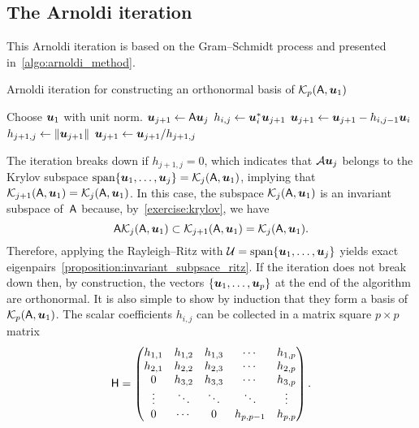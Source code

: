 \subsection{The Arnoldi iteration}
This Arnoldi iteration is based on the Gram--Schmidt process and presented in~\cref{algo:arnoldi_method}.
\begin{algorithm}
\caption{Arnoldi iteration for constructing an orthonormal basis of $\mathcal K_p(\mathsf A, \mathbf{\boldsymbol{u}}_1)$}%
\label{algo:arnoldi_method}%
\begin{algorithmic}
\State Choose $\mathbf{\boldsymbol{u}}_1$ with unit norm.
    \State $\mathbf{\boldsymbol{u}}_{j+1} \gets \mathsf A \mathbf{\boldsymbol{u}}_{j}$
        \State $h_{i,j} \gets \mathbf{\boldsymbol{u}}_{i}^* \mathbf{\boldsymbol{u}}_{j+1}$
        \State $\mathbf{\boldsymbol{u}}_{j+1} \gets \mathbf{\boldsymbol{u}}_{j+1} - h_{i,j-1} \mathbf{\boldsymbol{u}}_{i}$
    \EndFor
    \State $h_{j+1,j} \gets \lVert\mathbf{\boldsymbol{u}}_{j+1}\rVert$
    \State $\mathbf{\boldsymbol{u}}_{j+1} \gets \mathbf{\boldsymbol{u}}_{j+1} / h_{j+1,j}$
\EndFor
\end{algorithmic}
\end{algorithm}
The iteration breaks down if $h_{j+1,j} = 0$,
which indicates that $\mathcal A \mathbf{\boldsymbol{u}}_j$ belongs to the Krylov subspace $\operatorname{span} \{ \mathbf{\boldsymbol{u}}_1, \dotsc, \mathbf{\boldsymbol{u}}_j \} = \mathcal K_j(\mathsf A, \mathbf{\boldsymbol{u}}_1)$,
implying that $\mathcal K_{j+1}(\mathsf A, \mathbf{\boldsymbol{u}}_1) = \mathcal K_j(\mathsf A, \mathbf{\boldsymbol{u}}_1)$.
In this case, the subspace $\mathcal K_j(\mathsf A, \mathbf{\boldsymbol{u}}_1)$ is an invariant subspace of~$\mathsf A$ because, by~\cref{exercise:krylov},
we have
\[
    \mathsf A \mathcal K_j(\mathsf A, \mathbf{\boldsymbol{u}}_1)
    \subset \mathcal K_{j+1}(\mathsf A, \mathbf{\boldsymbol{u}}_1)
    = \mathcal K_j(\mathsf A, \mathbf{\boldsymbol{u}}_1).
\]
Therefore, applying the Rayleigh--Ritz with $\mathcal U = \operatorname{span} \{ \mathbf{\boldsymbol{u}}_1, \dotsc, \mathbf{\boldsymbol{u}}_j \}$ yields exact eigenpairs~\cref{proposition:invariant_subpsace_ritz}.
If the iteration does not break down then,
by construction,
the vectors $\{\mathbf{\boldsymbol{u}}_1, \dotsc, \mathbf{\boldsymbol{u}}_p\}$ at the end of the algorithm are orthonormal.
It is also simple to show by induction that they form a basis of~$\mathcal K_p(\mathsf A, \mathbf{\boldsymbol{u}}_1)$.
The scalar coefficients $h_{i,j}$ can be collected in a matrix square $p \times p$ matrix
\[
    \mathsf H
    =
    \begin{pmatrix}
        h_{1,1} & h_{1,2} & h_{1,3} & \cdots  & h_{1,p} \\
        h_{2,1} & h_{2,2} & h_{2,3} & \cdots  & h_{2,p} \\
        0       & h_{3,2} & h_{3,3} & \cdots  & h_{3,p} \\
        \vdots  & \ddots  & \ddots  & \ddots  & \vdots  \\
        0       & \cdots  & 0     & h_{p,p-1} & h_{p,p}
    \end{pmatrix}.
\]
